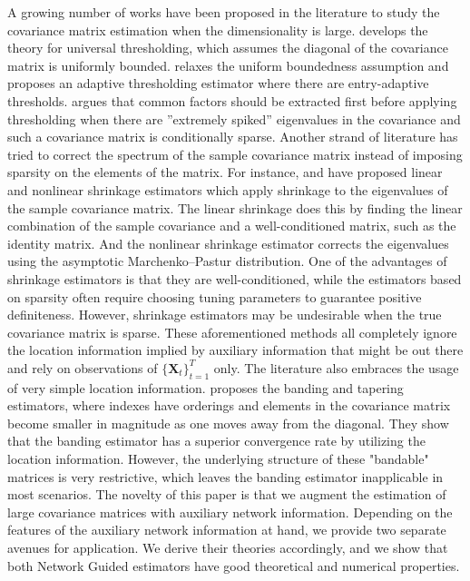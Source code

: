 A growing number of works have been proposed in the literature to study the covariance matrix estimation when the dimensionality is large.
\cite{bickel2008covariance} develops the theory for universal thresholding, which assumes the diagonal of the covariance matrix is uniformly bounded. 
\cite{cai2011AdaptiveThresholding} relaxes the uniform boundedness assumption and proposes an adaptive thresholding estimator where there are entry-adaptive thresholds. \cite{fan2013large} argues that common factors should be extracted first before applying thresholding when there are ”extremely spiked” eigenvalues in the covariance and such a covariance matrix is conditionally sparse. Another strand of literature has tried to correct the spectrum of the sample covariance matrix instead of imposing sparsity on the elements of the matrix. For instance, \cite{ledoit2004HoneyShrunk} and \cite{ledoit2012nonlinear} have proposed linear and nonlinear shrinkage estimators which apply shrinkage to the eigenvalues of the sample covariance matrix. The linear shrinkage does this by finding the linear combination of the sample covariance and a well-conditioned matrix, such as the identity matrix. And the nonlinear shrinkage estimator corrects the eigenvalues using the asymptotic Marchenko–Pastur distribution. One of the advantages of shrinkage estimators is
that they are well-conditioned, while the estimators based on sparsity often require choosing tuning parameters to guarantee positive definiteness. However, shrinkage estimators may be undesirable when the true covariance matrix is sparse. These aforementioned methods all completely ignore the location information implied by auxiliary information that might be out there and rely on observations of $\{\boldsymbol{X}_t\}_{t=1}^T$ only. The literature also embraces the usage of very simple location information. \cite{bickel2008regularized} proposes the banding and tapering estimators, where indexes have orderings and elements in the covariance matrix become smaller in magnitude as one moves away from the diagonal. They show that the banding estimator has a superior convergence rate by utilizing the location information. However, the underlying structure of these "bandable" matrices is very restrictive, which leaves the banding estimator inapplicable in most scenarios. The novelty of this paper is that we augment the estimation of large covariance matrices with auxiliary network information. Depending on the features of the auxiliary network information at hand, we provide two separate avenues for application. We derive their theories accordingly, and we show that both Network Guided estimators have good theoretical and numerical properties.


